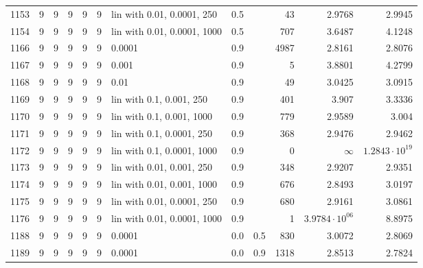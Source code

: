\begin{longtable}{lrrrrrlrrrrr}
1153 &       9 & 9 & 9 & 9 & 9 &  lin with 0.01, 0.0001, 250 &  0.5 &        &      43 &                 2.9768 &                 2.9945 \\
1154 &       9 & 9 & 9 & 9 & 9 & lin with 0.01, 0.0001, 1000 &  0.5 &        &     707 &                 3.6487 &                 4.1248 \\
1166 &       9 & 9 & 9 & 9 & 9 &                      0.0001 &  0.9 &        &    4987 &                 2.8161 &                 2.8076 \\
1167 &       9 & 9 & 9 & 9 & 9 &                       0.001 &  0.9 &        &       5 &                 3.8801 &                 4.2799 \\
1168 &       9 & 9 & 9 & 9 & 9 &                        0.01 &  0.9 &        &      49 &                 3.0425 &                 3.0915 \\
1169 &       9 & 9 & 9 & 9 & 9 &    lin with 0.1, 0.001, 250 &  0.9 &        &     401 &                  3.907 &                 3.3336 \\
1170 &       9 & 9 & 9 & 9 & 9 &   lin with 0.1, 0.001, 1000 &  0.9 &        &     779 &                 2.9589 &                  3.004 \\
1171 &       9 & 9 & 9 & 9 & 9 &   lin with 0.1, 0.0001, 250 &  0.9 &        &     368 &                 2.9476 &                 2.9462 \\
1172 &       9 & 9 & 9 & 9 & 9 &  lin with 0.1, 0.0001, 1000 &  0.9 &        &       0 &               $\infty$ &  $1.2843\cdot 10^{19}$ \\
1173 &       9 & 9 & 9 & 9 & 9 &   lin with 0.01, 0.001, 250 &  0.9 &        &     348 &                 2.9207 &                 2.9351 \\
1174 &       9 & 9 & 9 & 9 & 9 &  lin with 0.01, 0.001, 1000 &  0.9 &        &     676 &                 2.8493 &                 3.0197 \\
1175 &       9 & 9 & 9 & 9 & 9 &  lin with 0.01, 0.0001, 250 &  0.9 &        &     680 &                 2.9161 &                 3.0861 \\
1176 &       9 & 9 & 9 & 9 & 9 & lin with 0.01, 0.0001, 1000 &  0.9 &        &       1 &  $3.9784\cdot 10^{06}$ &                 8.8975 \\
1188 &       9 & 9 & 9 & 9 & 9 &                      0.0001 &  0.0 &    0.5 &     830 &                 3.0072 &                 2.8069 \\
1189 &       9 & 9 & 9 & 9 & 9 &                      0.0001 &  0.0 &    0.9 &    1318 &                 2.8513 &                 2.7824 \\

\end{longtable}
